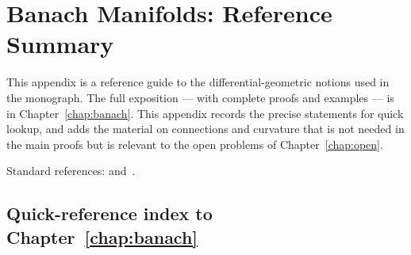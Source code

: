 
\chapter{Banach Manifolds: Reference Summary}
\label{app:manifolds}

This appendix is a reference guide to the differential-geometric notions
used in the monograph. The full exposition --- with complete proofs and
examples --- is in Chapter~\ref{chap:banach}. This appendix records
the precise statements for quick lookup, and adds the material on
connections and curvature that is not needed in the main proofs but
is relevant to the open problems of Chapter~\ref{chap:open}.

Standard references: \cite{Lang1999} and~\cite{Upmeier1985}.

\section{Quick-reference index to Chapter~\ref{chap:banach}}
\label{app:manifolds:index}

